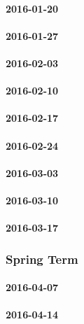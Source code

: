 \paragraph{2016-01-20}

\paragraph{2016-01-27}

\paragraph{2016-02-03}

\paragraph{2016-02-10}

\paragraph{2016-02-17}

\paragraph{2016-02-24}

\paragraph{2016-03-03}

\paragraph{2016-03-10}

\paragraph{2016-03-17}

\subsubsection{Spring Term}

\paragraph{2016-04-07}

\paragraph{2016-04-14}


